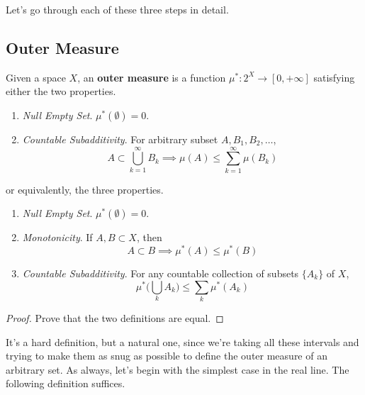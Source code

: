   Let's go through each of these three steps in detail. 

\subsection{Outer Measure} 

  \begin{definition}
    Given a space $X$, an \textbf{outer measure} is a function $\mu^\ast : 2^X \to [0, +\infty]$ satisfying either the two properties. 
    \begin{enumerate}
      \item \textit{Null Empty Set}. $\mu^\ast(\emptyset) = 0$. 
      \item \textit{Countable Subadditivity}. For arbitrary subset $A, B_1, B_2, \ldots$, 
      \begin{equation}
        A \subset \bigcup_{k=1}^\infty B_k \implies \mu(A) \leq \sum_{k=1}^\infty \mu(B_k)
      \end{equation} 
    \end{enumerate}

    or equivalently, the three properties. 
    \begin{enumerate}
      \item \textit{Null Empty Set}. $\mu^\ast(\emptyset) = 0$. 
      \item \textit{Monotonicity}. If $A, B \subset X$, then 
      \begin{equation}
        A \subset B \implies \mu^\ast (A) \leq \mu^\ast (B)
      \end{equation}
      \item \textit{Countable Subadditivity}. For any countable collection of subsets $\{A_k\}$ of $X$, 
      \begin{equation}
        \mu^\ast \bigg( \bigcup_k A_k \bigg) \leq \sum_{k} \mu^\ast (A_k) 
      \end{equation}
    \end{enumerate}
  \end{definition}
  \begin{proof}
    Prove that the two definitions are equal. 
  \end{proof} 

  It's a hard definition, but a natural one, since we're taking all these intervals and trying to make them as snug as possible to define the outer measure of an arbitrary set. As always, let's begin with the simplest case in the real line. The following definition suffices. 


